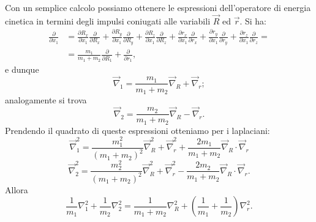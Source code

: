 Con un semplice calcolo possiamo ottenere le espressioni dell'operatore di energia cinetica in termini degli impulsi coniugati alle variabili $\vec{R}$ ed $\vec{r}$. Si ha:
	\begin{align} 
		\frac{\partial}{\partial x_1} & = \frac{\partial R_x}{\partial x_1} \frac{\partial}{\partial R_x}+\frac{\partial R_y}{\partial x_1} \frac{\partial}{\partial R_y}+\frac{\partial R_z}{\partial x_1} \frac{\partial}{\partial R_z}+\frac{\partial r_x}{\partial x_1} \frac{\partial}{\partial r_x}+\frac{\partial r_y}{\partial x_1} \frac{\partial}{\partial r_y}+\frac{\partial r_z}{\partial x_1} \frac{\partial}{\partial r_z}= \nonumber\\
 		& = \frac{m_1}{m_1+m_2}\frac{\partial}{\partial R_1}+\frac{\partial}{\partial r_1} ,
	\end{align}
e dunque
	\begin{equation}
		\vec{\nabla}_1=\frac{m_1}{m_1+m_2}\vec{\nabla}_R+\vec{\nabla}_r;
	\end{equation}
analogamente si trova
	\begin{equation}
		\vec{\nabla}_2=\frac{m_2}{m_1+m_2}\vec{\nabla}_R-\vec{\nabla}_r.
	\end{equation}
Prendendo il quadrato di queste espressioni otteniamo per i laplaciani:
	\begin{equation}
		\vec{\nabla}_1^2=\frac{m_1^2}{\left(m_1+m_2\right)^2}\vec{\nabla}_R^2+\vec{\nabla}_r^2+\frac{2m_1}{m_1+m_2}\vec{\nabla}_R\cdot\vec{\nabla}_r
	\end{equation}
\begin{equation}
\vec{\nabla}_2^2=\frac{m_2^2}{\left(m_1+m_2\right)^2}\vec{\nabla}_R^2+\vec{\nabla}_r^2-\frac{2m_2}{m_1+m_2}\vec{\nabla}_R\cdot\vec{\nabla}_r.
\end{equation}
Allora
\begin{equation}
\frac{1}{m_1}\nabla_1^2+\frac{1}{m_2}\nabla_2^2=\frac{1}{m_1+m_2}\nabla_R^2+\left(\frac{1}{m_1}+\frac{1}{m_2}\right)\nabla_r^2 .
\end{equation}\\

